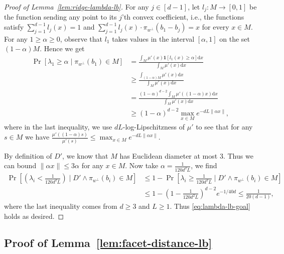 \documentclass{article}\usepackage[a4paper,margin=20mm]{geometry}
\begin{document}
\begin{proof}[Proof of Lemma~\ref{lem:ridge-lambda-lb}]
    For any $j \in [d-1]$, let $l_j : M \to [0, 1]$ be the function sending any point
    to its $j$'th convex coefficient, i.e., the functions satisfy $\sum_{j=1}^{d-1} l_j(x) = 1$
    and $\sum_{j=1}^{d-1} l_j(x) \cdot \pi_{w^\perp}(b_1 - b_j)  = x$ for every $x \in M$.
    For any $1 \geq \alpha \geq 0$, observe that $l_1$
    takes values in the interval $[\alpha, 1]$
    on the set $(1-\alpha) M$. Hence we get
    \begin{align*}
        \Pr[\lambda_1 \geq \alpha \mid \pi_{w^\perp}(b_1) \in M]
        &= \frac{
            \int_{M} \mu'(x) \mathbf{1}[l_1(x) \geq \alpha] \mathrm d x
            }{
                \int_{M} \mu'(x) \mathrm d x
            } \\
        &\geq \frac{
            \int_{(1-\alpha) M} \mu'(x) \mathrm d x
            }{
                \int_{M} \mu'(x) \mathrm d x
            }
            \tag{$\forall x \in (1-\alpha)M$, $l_1(x) \geq \alpha$}\\
        &= \frac{
            (1-\alpha)^{d-2} \int_{M} \mu'((1-\alpha)x) \mathrm d x
            }{
                \int_{M} \mu'(x) \mathrm d x
            }
            \\
        &\geq
            (1-\alpha)^{d-2} \max_{x \in M} e^{-dL\|\alpha x\|},
    \end{align*}
    where in the last inequality, we use $dL$-log-Lipschitzness of $\mu'$ to see that for any $s \in M$
    we have $\frac{\mu'((1-\alpha)s)}{\mu'(s)} \leq \max_{x \in M}e^{-dL \|\alpha x\|}$.
    
    By definition of $D'$, we know that $M$ has Euclidean diameter at most $3$.
    Thus we can bound $\|\alpha x\| \leq 3\alpha$ for any $x\in M$.
    Now take $\alpha = \frac{1}{120d^2L}$, we find
    \begin{align*}
        \Pr[(\lambda_i < \frac{1}{120d^2 L}) \mid D' \wedge \pi_{w^\perp}(b_i) \in M] &\leq 1 -
        \Pr[\lambda_i \geq \frac{1}{120d^2 L} \mid D' \wedge \pi_{w^\perp}(b_i) \in M] \\
        &\leq 1 - (1-\frac{1}{120 d^2 L})^{d-2} e^{-1/40d}
        \leq \frac{1}{20(d-1)},
    \end{align*}
    where the last inequality comes from $d \geq 3$ and $L \geq 1$. Thus \eqref{eq:lambda-lb-goal} holds as desired.
\end{proof}



\subsection{Proof of Lemma~\ref{lem:facet-distance-lb}}\label{sec:pf-facet-dist}
\end{document}
